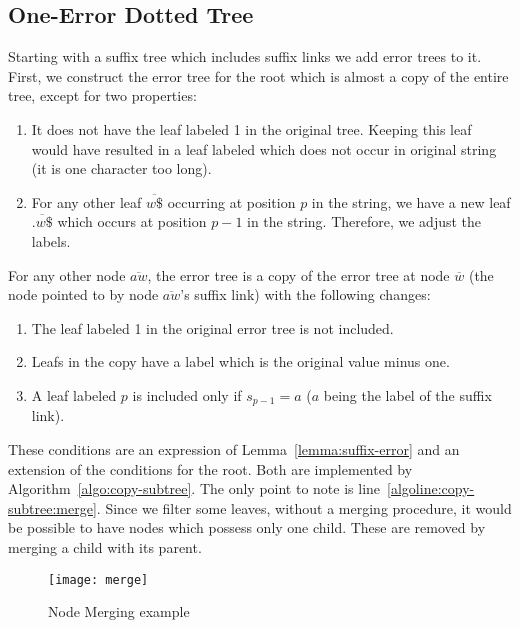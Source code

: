 \subsection{One-Error Dotted Tree}

Starting with a suffix tree which includes suffix links we add error trees to it. First, we construct the error tree for the root which is almost a copy of the entire tree, except for two properties:

\begin{enumerate}
\item It does not have the leaf labeled 1 in the original tree. Keeping this leaf would have resulted in a leaf labeled  which does not occur in original string (it is one character too long).
\item For any other leaf $\overline{w\$}$ occurring at position $p$ in the string, we have a new leaf $\overline{.w\$}$ which occurs at position $p-1$ in the string. Therefore, we adjust the labels.
\end{enumerate}

For any other node $\overline{aw}$, the error tree is a copy of the error tree at node $\overline{w}$ (the node pointed to by node $\overline{aw}$'s suffix link) with the following changes:

\begin{enumerate}
\item The leaf labeled 1 in the original error tree is not included.
\item Leafs in the copy have a label which is the original value minus one.
\item A leaf labeled $p$ is included only if $s_{p-1} = a$ ($a$ being the label of the suffix link).
\end{enumerate}


%

These conditions are an expression of Lemma~\ref{lemma:suffix-error} and an extension of the conditions for the root. Both are implemented by Algorithm~\ref{algo:copy-subtree}. The only point to note is line~\ref{algoline:copy-subtree:merge}. Since we filter some leaves, without a merging procedure, it would be possible to have nodes which possess only one child. These are removed by merging a child with its parent.
\begin{figure}
\centering
\texttt{[image: merge]}
\caption{Node Merging example}%
\label{fig:merge}
\end{figure}

